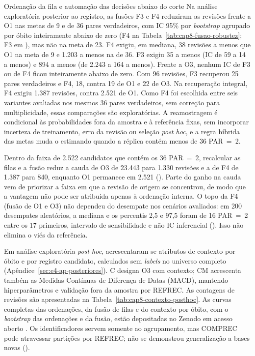 \begin{chapter}{Ordenação da fila e automação das decisões abaixo do corte}
Na análise exploratória posterior ao registro, as fusões F3 e F4 reduziram as revisões frente a O1 nas metas de 9 e de 36 pares verdadeiros, com IC 95\% por \textit{bootstrap} agrupado por óbito inteiramente abaixo de zero (F4 na Tabela~\ref{tab:cap8-fusao-robustez}; F3 em ), mas não na meta de 23. F4 exigiu, em mediana, 38 revisões a menos que O1 na meta de 9 e 1.203 a menos na de 36. F3 exigiu 35 a menos (IC de 59 a 14 a menos) e 894 a menos (de 2.243 a 164 a menos). Frente a O3, nenhum IC de F3 ou de F4 ficou inteiramente abaixo de zero. Com 96 revisões, F3 recuperou 25 pares verdadeiros e F4, 18, contra 19 de O1 e 22 de O3. Na recuperação integral, F4 exigiu 1.387 revisões, contra 2.521 de O1. Como F4 foi escolhida entre seis variantes avaliadas nos mesmos 36 pares verdadeiros, sem correção para multiplicidade, essas comparações são exploratórias. A reamostragem é condicional às probabilidades fora da amostra e à referência fixas, sem incorporar incerteza de treinamento, erro da revisão ou seleção \textit{post hoc}, e a regra híbrida das metas muda o estimando quando a réplica contém menos de 36 PAR~=~2.



Dentro da faixa de 2.522 candidatos que contém os 36 PAR~=~2, recalcular as filas e a fusão reduz a cauda de O3 de 23.443 para 1.330 revisões e a de F4 de 1.387 para 840, enquanto O1 permanece em 2.521 (). Parte do ganho na cauda vem de priorizar a faixa em que a revisão de origem se concentrou, de modo que a vantagem não pode ser atribuída apenas à ordenação interna. O topo da F4 (fusão de O1 e O3) não dependeu do desempate nos cenários avaliados: em 200 desempates aleatórios, a mediana e os percentis 2,5 e 97,5 foram de 16 PAR~=~2 entre os 17 primeiros, intervalo de sensibilidade e não IC inferencial (). Isso não elimina o viés da referência.

Em análise exploratória \textit{post hoc}, acrescentaram-se atributos de contexto por óbito e por registro candidato, calculados sem \textit{labels} no universo completo (Apêndice~\ref{sec:e4-ap-posteriores}). C designa O3 com contexto; CM acrescenta também as Medidas Contínuas de Diferença de Datas (MACD), mantendo hiperparâmetros e validação fora da amostra por REFREC. As contagens de revisões são apresentadas na Tabela~\ref{tab:cap8-contexto-posthoc}. As curvas completas das ordenações, da fusão de filas e do contexto por óbito, com o \textit{bootstrap} das ordenações e da fusão, estão depositadas no Zenodo em acesso aberto \cite{Jardim2026curvas}. Os identificadores servem somente ao agrupamento, mas COMPREC pode atravessar partições por REFREC; não se demonstrou generalização a bases novas ().


\end{chapter}
